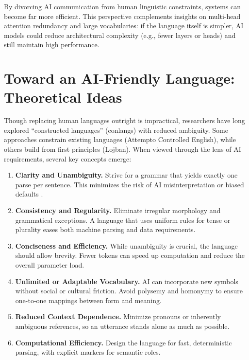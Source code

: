 \documentclass{article} %
\begin{document}
By divorcing AI communication from human linguistic constraints, systems can become far more efficient. This perspective complements insights on multi-head attention redundancy and large vocabularies: if the language itself is simpler, AI models could reduce architectural complexity (e.g., fewer layers or heads) and still maintain high performance.

\section{Toward an AI-Friendly Language: Theoretical Ideas}
Though replacing human languages outright is impractical, researchers have long explored “constructed languages” (conlangs) with reduced ambiguity. Some approaches constrain existing languages (Attempto Controlled English), while others build from first principles (Lojban). When viewed through the lens of AI requirements, several key concepts emerge:

\begin{enumerate}
    \item \textbf{Clarity and Unambiguity.} Strive for a grammar that yields exactly one parse per sentence. This minimizes the risk of AI misinterpretation or biased defaults \citep{Guo2024}.
    
    \item \textbf{Consistency and Regularity.} Eliminate irregular morphology and grammatical exceptions. A language that uses uniform rules for tense or plurality eases both machine parsing and data requirements.
    
    \item \textbf{Conciseness and Efficiency.} While unambiguity is crucial, the language should allow brevity. Fewer tokens can speed up computation and reduce the overall parameter load.
    
    \item \textbf{Unlimited or Adaptable Vocabulary.} AI can incorporate new symbols without social or cultural friction. Avoid polysemy and homonymy to ensure one-to-one mappings between form and meaning.
    
    \item \textbf{Reduced Context Dependence.} Minimize pronouns or inherently ambiguous references, so an utterance stands alone as much as possible.
    
    \item \textbf{Computational Efficiency.} Design the language for fast, deterministic parsing, with explicit markers for semantic roles.
\end{enumerate}
\end{document}
